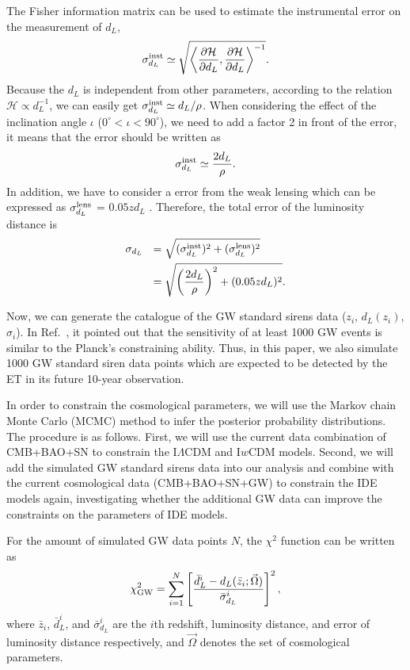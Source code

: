 \documentclass[aps,prd,nofootinbib,amsmath,amssymb,superscriptaddress,twocolumn,10pt]{revtex4}%
\begin{document}
The Fisher information matrix can be used to estimate the instrumental error on the measurement of $d_{L}$,
\begin{align}
\sigma_{d_L}^{\rm inst}\simeq \sqrt{\left\langle\frac{\partial \mathcal H}{\partial d_L},\frac{\partial \mathcal H}{\partial d_L}\right\rangle^{-1}}.
\end{align}
Because the $d_{L}$ is independent from other parameters, according to the relation $\mathcal H \propto d_L^{-1}$, we can easily get $\sigma_{d_L}^{\rm inst}\simeq d_L/\rho$. When considering the effect of the inclination angle $\iota$ ($0^{\circ}<\iota<90^{\circ}$), we need to add a factor 2 in front of the error, it means that the error should be written as
\begin{equation}
\sigma_{d_L}^{\rm inst}\simeq \frac{2d_L}{\rho}.
\label{sigmainst}
\end{equation}
In addition, we have to consider a error from the weak lensing which can be expressed as $\sigma_{d_L}^{\rm lens}$ = $0.05z d_L$ \cite{Cai:2016sby}. Therefore, the total error of the luminosity distance is
\begin{align}
\sigma_{d_L}&~~=\sqrt{(\sigma_{d_L}^{\rm inst})^2+(\sigma_{d_L}^{\rm lens})^2} \nonumber\\
            &~~=\sqrt{\left(\frac{2d_L}{\rho}\right)^2+(0.05z d_L)^2}.
\label{sigmadl}
\end{align}

Now, we can generate the catalogue of the GW standard sirens data ($z_{i}$, $d_{L}(z_{i})$, $\sigma_{i}$). In Ref.~\cite{Cai:2016sby}, it pointed out that the sensitivity of at least 1000 GW events is similar to the Planck's constraining ability. Thus, in this paper, we also simulate 1000 GW standard siren data points which are expected to be detected by the ET in its future 10-year observation.

In order to constrain the cosmological parameters, we will use the Markov chain Monte Carlo (MCMC) method to infer the posterior probability distributions.
The procedure is as follows. First, we will use the current data combination of CMB+BAO+SN to constrain the I$\Lambda$CDM and I$w$CDM models. Second, we will add the simulated GW standard sirens data into our analysis and combine with the current cosmological data (CMB+BAO+SN+GW) to constrain the IDE models again, investigating whether the additional GW data can improve the constraints on the parameters of IDE models.

For the amount of simulated GW data points $N$, the $\chi^2$ function can be written as
\begin{align}
\chi_{\rm GW}^2=\sum\limits_{i=1}^{N}\left[\frac{\bar{d}_L^i-d_L(\bar{z}_i;\vec{\Omega})}{\bar{\sigma}_{d_L}^i}\right]^2,
\label{equa:chi2}
\end{align}
where $\bar{z}_i$, $\bar{d}_L^i$, and $\bar{\sigma}_{d_L}^i$ are the $i$th redshift, luminosity distance, and error of luminosity distance respectively, and $\vec{\Omega}$ denotes the set of cosmological parameters.
\end{document}
